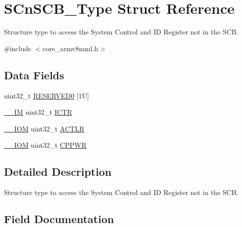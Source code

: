 \hypertarget{struct_s_cn_s_c_b___type}{}\section{S\+Cn\+S\+C\+B\+\_\+\+Type Struct Reference}
\label{struct_s_cn_s_c_b___type}


Structure type to access the System Control and ID Register not in the S\+CB.  




{\ttfamily \#include $<$core\+\_\+armv8mml.\+h$>$}

\subsection*{Data Fields}
\begin{DoxyCompactItemize}
\item 
uint32\+\_\+t \mbox{\hyperlink{struct_s_cn_s_c_b___type_affae06cd6df5e9fe9a92994052fd3bec}{R\+E\+S\+E\+R\+V\+E\+D0}} \mbox{[}1\+U\mbox{]}
\item 
\mbox{\hyperlink{core__cm4_8h_a4cc1649793116d7c2d8afce7a4ffce43}{\+\_\+\+\_\+\+IM}} uint32\+\_\+t \mbox{\hyperlink{struct_s_cn_s_c_b___type_acf9b76331abd768af25a10b3625da4b4}{I\+C\+TR}}
\item 
\mbox{\hyperlink{core__cm4_8h_ab6caba5853a60a17e8e04499b52bf691}{\+\_\+\+\_\+\+I\+OM}} uint32\+\_\+t \mbox{\hyperlink{struct_s_cn_s_c_b___type_afabed911b9f91f9df848999e1b5d6504}{A\+C\+T\+LR}}
\item 
\mbox{\hyperlink{core__cm4_8h_ab6caba5853a60a17e8e04499b52bf691}{\+\_\+\+\_\+\+I\+OM}} uint32\+\_\+t \mbox{\hyperlink{struct_s_cn_s_c_b___type_a6236035fc90059a599910d9cb9299ff0}{C\+P\+P\+WR}}
\end{DoxyCompactItemize}


\subsection{Detailed Description}
Structure type to access the System Control and ID Register not in the S\+CB. 

\subsection{Field Documentation}
\mbox{\label{struct_s_cn_s_c_b___type_afabed911b9f91f9df848999e1b5d6504}} 
